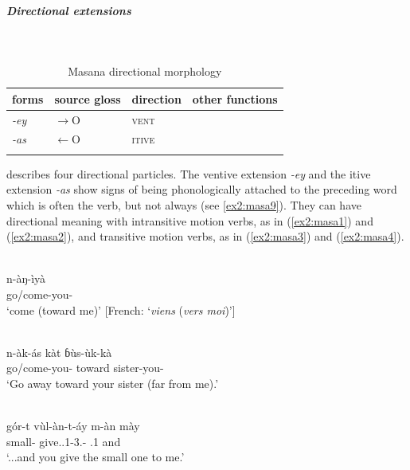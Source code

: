 \subparagraph{Directional extensions}~

\begin{table}[H]
	\caption{Masana directional morphology}
	\label{tab:masa}
	\begin{tabular}{llll} %
		\lsptoprule
		forms & source gloss & direction  & other functions  \\ %
		\midrule
		\textit{-ey}  &  $\rightarrow$O  & \textsc{vent}  &   \\
		\textit{-as}  &  ͏͏$\leftarrow$O  & \textsc{itive} &     \\
		\lspbottomrule
	\end{tabular}
\end{table}

\citet{melisDescriptionMasaTchad1999} describes four directional particles. The ventive extension \textit{-ey} and the itive extension \textit{-as} show signs of being phonologically attached to the preceding word which is often the verb, but not always (see \ref{ex2:masa9}). They can have directional meaning with intransitive motion verbs, as in (\ref{ex2:masa1}) and (\ref{ex2:masa2}), and transitive motion verbs, as in (\ref{ex2:masa3}) and (\ref{ex2:masa4}).

\ea\label{ex2:masa1}
 \\
\gll  n-àŋ-ìyà	\\
go/come-you-	\\
\glt `come (toward me)' [French: `\textit{viens} (\textit{vers moi})']

\ex\label{ex2:masa2}
 \\
\gll n-àk-ás kàt ɓùs-ùk-kà	\\
go/come-you- toward sister-you-	\\
\glt `Go away toward your sister (far from me).' 

\ex\label{ex2:masa3}
 \\
\gll gór-t vùl-àn-t-áy m-àn mày	\\
small- give..1-3.- .1 and	\\
\glt `...and you give the small one to me.' 

